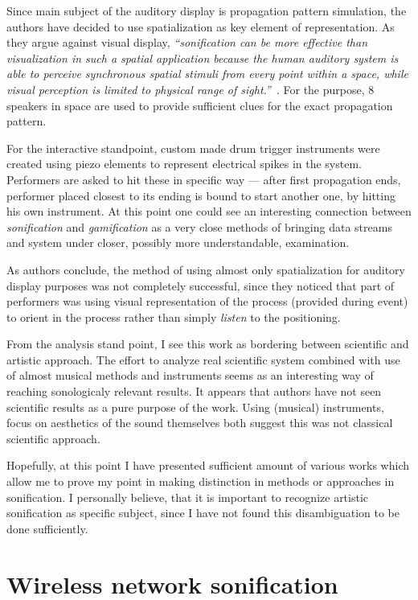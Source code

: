 \documentclass[12pt,a4paper,oneside]{report}
\begin{document}
Since main subject of the auditory display is propagation pattern simulation, the authors have decided to use spatialization as key element of representation. As they argue against visual display, \emph{``sonification can be more effective than visualization in such a spatial application because the human auditory system is able to perceive synchronous spatial stimuli from every point within a space, while visual perception is limited to physical range of sight.''}~\cite[p.~9]{Weinberg2006}. For the purpose, 8 speakers in space are used to provide sufficient clues for the exact propagation pattern.

For the interactive standpoint, custom made drum trigger instruments were created using piezo elements to represent electrical spikes in the system. Performers are asked to hit these in specific way --- after first propagation ends, performer placed closest to its ending is bound to start another one, by hitting his own instrument. At this point one could see an interesting connection between \emph{sonification} and \emph{gamification} as a very close methods of bringing data streams and system under closer, possibly more understandable, examination.

As authors conclude, the method of using almost only spatialization for auditory display purposes was not completely successful, since they noticed that part of performers was using visual representation of the process (provided during event) to orient in the process rather than simply \emph{listen} to the positioning. 

From the analysis stand point, I see this work as bordering between scientific and artistic approach. The effort to analyze real scientific system combined with use of almost musical methods and instruments seems as an interesting way of reaching sonologicaly relevant results. It appears that authors have not seen scientific results as a pure purpose of the work. Using (musical) instruments, focus on aesthetics of the sound themselves both suggest this was not classical scientific approach.

Hopefully, at this point I have presented sufficient amount of various works which allow me to prove my point in making distinction in methods or approaches in sonification. I personally believe, that it is important to recognize artistic sonification as specific subject, since I have not found this disambiguation to be done sufficiently.

\clearpage
\section{Wireless network sonification}
\label{sec:wifi}
\end{document}
